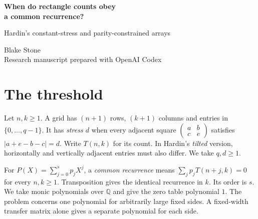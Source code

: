 \documentclass[11pt,letterpaper]{article}
\begin{document}
\thispagestyle{plain}
\begin{center}
{\LARGE\bfseries When do rectangle counts obey\\[2pt] a common recurrence?\par}
\vspace{0.45em}
{\large Hardin's constant-stress and parity-constrained arrays\par}
\vspace{0.65em}
Blake Stone\\
{\small Research manuscript prepared with OpenAI Codex}
\end{center}

\begin{abstract}
R. H. Hardin observed that certain rectangular array counts appear to satisfy the same recurrence at every width. We determine exactly when a common linear recurrence exists for the constant-stress rule, with or without the requirement that adjacent entries differ. The positive direction represents a boundary word by a finite bipartite graph. The negative direction places independent binary choices at a positive fraction of the sites. We compute the least common recurrence in 25 tables, verifying the 22 all-width predictions in those tables and identifying five previously proved cases. We also prove three all-width predictions for two different local rules involving four order statistics or six absolute differences.
\end{abstract}

\section{The threshold}

Let $n,k\ge1$. A grid has $(n+1)$ rows, $(k+1)$ columns and entries in
$\{0,\ldots,q-1\}$. It has \emph{stress $d$} when every adjacent square
$\left(\begin{smallmatrix}a&b\\c&e\end{smallmatrix}\right)$ satisfies $|a+e-b-c|=d$.
Write $T(n,k)$ for its count. In Hardin's \emph{tilted} version, horizontally and vertically adjacent entries must also differ. We take $q,d\ge1$.

For $P(X)=\sum_{j=0}^s p_jX^j$, a \emph{common recurrence} means
$\sum_j p_j T(n+j,k)=0$ for every $n,k\ge1$. Transposition gives the identical recurrence in $k$. Its order is $s$. We take monic polynomials over $\mathbb Q$ and give the zero table polynomial $1$. The problem concerns one polynomial for arbitrarily large fixed sides. A fixed-width transfer matrix alone gives a separate polynomial for each side.
\end{document}
